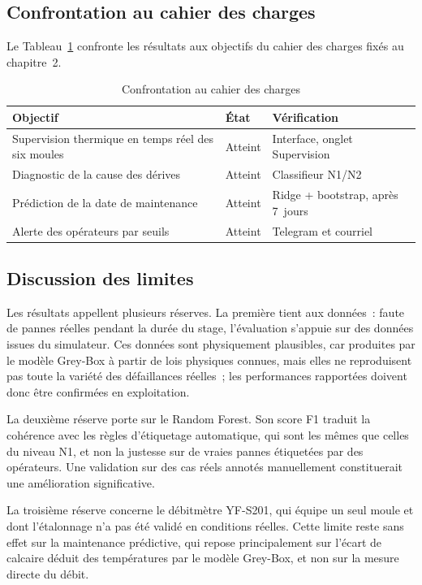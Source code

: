 \subsection{Confrontation au cahier des charges}

Le Tableau~\ref{tab:cdc} confronte les résultats aux objectifs du cahier des charges fixés au chapitre~2.

\begin{table}[htbp]
\centering
\renewcommand{\arraystretch}{1.45}
\caption{Confrontation au cahier des charges}
\label{tab:cdc}
\begin{tabular}{|p{}|p{}|p{}|}
\hline
\rowcolor{gray!25}
\textbf{Objectif} & \textbf{État} & \textbf{Vérification} \\
\hline
Supervision thermique en temps réel des six moules & Atteint & Interface, onglet Supervision \\
\hline
Diagnostic de la cause des dérives & Atteint & Classifieur N1/N2 \\
\hline
Prédiction de la date de maintenance & Atteint & Ridge + bootstrap, après 7~jours \\
\hline
Alerte des opérateurs par seuils & Atteint & Telegram et courriel \\
\hline
\end{tabular}
\end{table}

\subsection{Discussion des limites}

Les résultats appellent plusieurs réserves. La première tient aux données~: faute de pannes réelles pendant la durée du stage, l'évaluation s'appuie sur des données issues du simulateur. Ces données sont physiquement plausibles, car produites par le modèle Grey-Box à partir de lois physiques connues, mais elles ne reproduisent pas toute la variété des défaillances réelles~; les performances rapportées doivent donc être confirmées en exploitation.

La deuxième réserve porte sur le Random Forest. Son score F1 traduit la cohérence avec les règles d'étiquetage automatique, qui sont les mêmes que celles du niveau N1, et non la justesse sur de vraies pannes étiquetées par des opérateurs. Une validation sur des cas réels annotés manuellement constituerait une amélioration significative.

La troisième réserve concerne le débitmètre YF-S201, qui équipe un seul moule et dont l'étalonnage n'a pas été validé en conditions réelles. Cette limite reste sans effet sur la maintenance prédictive, qui repose principalement sur l'écart de calcaire déduit des températures par le modèle Grey-Box, et non sur la mesure directe du débit.

